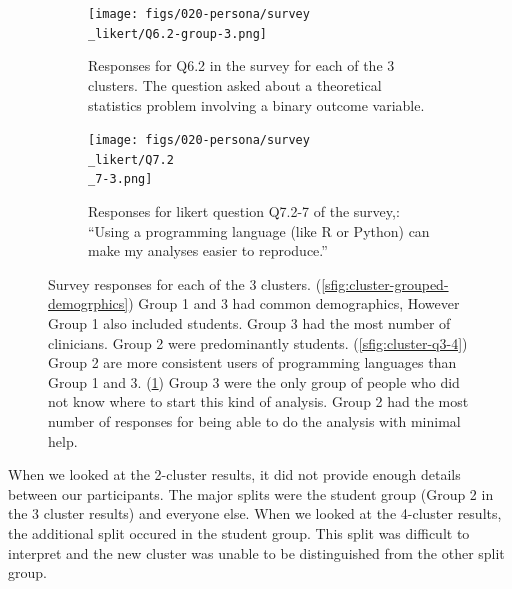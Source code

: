 \documentclass[020-persona\_validation.tex]{subfiles}
\begin{document}
\begin{figure}[htb]
            \begin{subfigure}[h]{0.45\textwidth}
                \centering
                \texttt{[image: figs/020-persona/survey\\\_likert/Q6.2-group-3.png]}
                \caption[Statistics question for logistic regression (Q6.2) for 3 clusters]
                {Responses for Q6.2 in the survey for each of the 3 clusters.
                    The question asked about a theoretical statistics problem involving a binary outcome variable.
                }
                \label{sfig:cluster-q6-2}
            \end{subfigure}
            \begin{subfigure}[h]{0.45\textwidth}
                \centering
                \texttt{[image: figs/020-persona/survey\\\_likert/Q7.2\\\_7-3.png]}
                \caption[Data programming Q7.2-7 for 3 clusters.]
                {Responses for likert question Q7.2-7 of the survey,:
                    ``Using a programming language (like R or Python) can make my analyses easier to reproduce.''
                }
                \label{sfig:cluster-q7-2-7}
            \end{subfigure}
            \caption[Selected survey questions for 3 clusters]
            {Survey responses for each of the 3 clusters.
                (\ref{sfig:cluster-grouped-demogrphics})
                Group 1 and 3 had common demographics, However Group 1 also included students.
                Group 3 had the most number of clinicians.
                Group 2 were predominantly students.
                (\ref{sfig:cluster-q3-4})
                Group 2 are more consistent users of programming languages than Group 1 and 3.
                (\ref{sfig:cluster-q6-2})
                Group 3 were the only group of people who did not know where to start this kind of analysis.
                Group 2 had the most number of responses for being able to do the analysis with minimal help.
            }
            \label{fig:cluster-results}
        \end{figure}

        When we looked at the 2-cluster results,
        it did not provide enough details between our participants.
        The major splits were the student group (Group 2 in the 3 cluster results) and everyone else.
        When we looked at the 4-cluster results,
        the additional split occured in the student group.
        This split was difficult to interpret and the new cluster was unable to be distinguished from the other split group.
\end{document}
